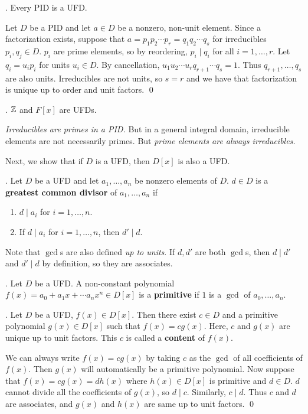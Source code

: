 \thm. Every PID is a UFD.

\pf Let \(D\) be a PID and let \(a \in D\) be a nonzero, non-unit element. Since a factorization exists, suppose that \(a = p_1 p_2 \cdots p_r = q_1 q_2 \cdots q_s\) for irreducibles \(p_i, q_j \in D\). \(p_i\) are prime elements, so by reordering, \(p_i \mid q_i\) for all \(i = 1, \dots, r\). Let \(q_i = u_i p_i\) for units \(u_i \in D\). By cancellation, \(u_1 u_2 \cdots u_r q_{r+1} \cdots q_s = 1\). Thus \(q_{r+1}, \dots, q_s\) are also units. Irreducibles are not units, so \(s = r\) and we have that factorization is unique up to order and unit factors. \qed

\cor. \(\mathbb{Z}\) and \(F[x]\) are UFDs.

\rmk \textit{Irreducibles are primes in a PID.} But in a general integral domain, irreducible elements are not necessarily primes. But \textit{prime elements are always irreducibles.}

\pagebreak

Next, we show that if \(D\) is a UFD, then \(D[x]\) is also a UFD.

.  Let \(D\) be a UFD and let \(a_1, \dots, a_n\) be nonzero elements of \(D\). \(d \in D\) is a \textbf{greatest common divisor} of \(a_1, \dots, a_n\) if
\begin{enumerate}
    \item \(d \mid a_i\) for \(i = 1, \dots, n\).
    \item If \(d \mid a_i\) for \(i = 1, \dots, n\), then \(d' \mid d\).
\end{enumerate}

Note that \(\gcd\)s are also defined \textit{up to units}. If \(d, d'\) are both \(\gcd\)s, then \(d \mid d'\) and \(d' \mid d\) by definition, so they are associates.

.  Let \(D\) be a UFD. A non-constant polynomial \(f(x) = a_0 + a_1 x + \cdots a_n x^n \in D[x]\) is a \textbf{primitive} if \(1\) is a \(\gcd\) of \(a_0, \dots, a_n\).

\lemma. Let \(D\) be a UFD, \(f(x) \in D[x]\). Then there exist \(c \in D\) and a primitive polynomial \(g(x) \in D[x]\) such that \(f(x) = cg(x)\). Here, \(c\) and \(g(x)\) are unique up to unit factors. This \(c\) is called a \textbf{content} of \(f(x)\).

\pf We can always write \(f(x) = cg(x)\) by taking \(c\) as the \(\gcd\) of all coefficients of \(f(x)\). Then \(g(x)\) will automatically be a primitive polynomial. Now suppose that \(f(x) = cg(x) = dh(x)\) where \(h(x) \in D[x]\) is primitive and \(d \in D\). \(d\) cannot divide all the coefficients of \(g(x)\), so \(d \mid c\). Similarly, \(c \mid d\). Thus \(c\) and \(d\) are associates, and \(g(x)\) and \(h(x)\) are same up to unit factors. \qed

